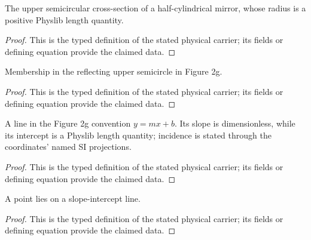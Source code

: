\begin{definition}
  \label{def:physics:IPhO_2026_2_C_1:aux008}
  The upper semicircular cross-section of a half-cylindrical mirror, whose
  radius is a positive Physlib length quantity.
\end{definition}
\begin{proof}
  This is the typed definition of the stated physical carrier; its fields or defining equation provide the claimed data.
\end{proof}

\begin{definition}
  \label{def:physics:IPhO_2026_2_C_1:aux009}
  Membership in the reflecting upper semicircle in Figure 2g.
\end{definition}
\begin{proof}
  This is the typed definition of the stated physical carrier; its fields or defining equation provide the claimed data.
\end{proof}

\begin{definition}
  \label{def:physics:IPhO_2026_2_C_1:aux010}
  A line in the Figure 2g convention \(y=mx+b\).  Its slope is
  dimensionless, while its intercept is a Physlib length quantity; incidence
  is stated through the coordinates' named SI projections.
\end{definition}
\begin{proof}
  This is the typed definition of the stated physical carrier; its fields or defining equation provide the claimed data.
\end{proof}

\begin{definition}
  \label{def:physics:IPhO_2026_2_C_1:aux011}
  A point lies on a slope-intercept line.
\end{definition}
\begin{proof}
  This is the typed definition of the stated physical carrier; its fields or defining equation provide the claimed data.
\end{proof}


